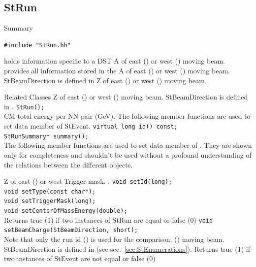 \begin{Entry}
%
%
\subsection{StRun}
    
\label{sec:StRun}

\item[Summary]

    \verb+#include "StRun.hh"+\\
    
     holds information specific to a DST
    A of east () or west () moving beam.
    provides all information stored in the 
    A of east () or west () moving beam.
    StBeamDirection is defined in 
    Z of east () or west () moving beam.
\item[Related Classes]
    Z of east () or west () moving beam.
    StBeamDirection is defined in .
    \verb+StRun();+ \\
     CM total energy per NN pair (GeV).
    The following member functions are used to set data member of StEvent.
    \verb+virtual long id() const;+\\
    \verb+StRunSummary* summary();+\\
    The following member functions are used to set data member of .
    They are shown only for completeness and shouldn't be used without
    a profound understanding of the relations between the different objects.    
    
     Z of east () or west
    Trigger mask. 
    .
    \verb+void setId(long);+\\
    \verb+void setType(const char*);+\\
    \verb+void setTriggerMask(long);+\\
    \verb+void setCenterOfMassEnergy(double);+\\
    Returns true (1) if two instances of StRun are equal or false (0)
    \verb+void setBeamCharge(StBeamDirection, short);+\\
    Note that only the run id () is used for the comparison.
    () moving beam.  StBeamDirection is defined in
     (see sec.~\ref{sec:StEnumerations}).
    Returns true (1) if two instances of StEvent are not equal or false (0)
    

\end{Entry}
